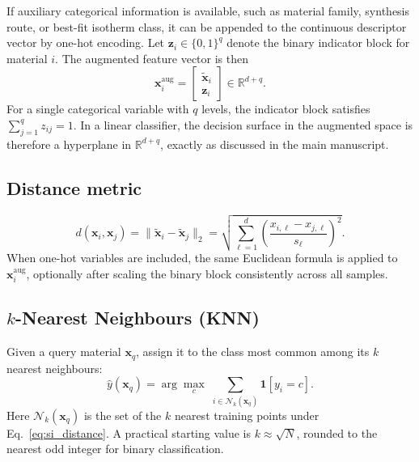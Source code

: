 \documentclass[journal=jacsat,manuscript=article]{achemso}
\begin{document}
If auxiliary categorical information is available, such as material
family, synthesis route, or best-fit isotherm class, it can be appended
to the continuous descriptor vector by one-hot encoding. Let
$\mathbf{z}_i \in \{0,1\}^{q}$ denote the binary indicator block for
material $i$. The augmented feature vector is then
\begin{equation}
	\mathbf{x}_i^{\mathrm{aug}}
	=
	\begin{bmatrix}
	\tilde{\mathbf{x}}_i\\
	\mathbf{z}_i
	\end{bmatrix}
	\in \mathbb{R}^{d+q}.
	\label{eq:si_onehot}
\end{equation}
For a single categorical variable with $q$ levels, the indicator block
satisfies $\sum_{j=1}^{q} z_{ij} = 1$. In a linear classifier, the
decision surface in the augmented space is therefore a hyperplane in
$\mathbb{R}^{d+q}$, exactly as discussed in the main manuscript.

\subsection{Distance metric}
\label{sec:si_distance_metric}
\begin{equation}
	d(\mathbf{x}_i, \mathbf{x}_j)
	= \|\tilde{\mathbf{x}}_i - \tilde{\mathbf{x}}_j\|_2
	= \sqrt{\sum_{\ell=1}^{d}
		\left(\frac{x_{i,\ell} - x_{j,\ell}}{s_\ell}\right)^{\!2}}.
	\label{eq:si_distance}
\end{equation}
When one-hot variables are included, the same Euclidean formula is
applied to $\mathbf{x}_i^{\mathrm{aug}}$, optionally after scaling the
binary block consistently across all samples.

\subsection{$k$-Nearest Neighbours (KNN)}
\label{sec:si_KNN}

Given a query material $\mathbf{x}_q$, assign it to the class
most common among its $k$ nearest neighbours:
\begin{equation}
	\hat{y}(\mathbf{x}_q)
	= \arg\max_{c}\;
	\sum_{i \in \mathcal{N}_k(\mathbf{x}_q)} \mathbf{1}[y_i = c].
	\label{eq:si_KNN}
\end{equation}
Here $\mathcal{N}_k(\mathbf{x}_q)$ is the set of the $k$ nearest
training points under Eq.~\eqref{eq:si_distance}. A practical starting
value is $k \approx \sqrt{N}$, rounded to the nearest odd integer for
binary classification.
\end{document}
